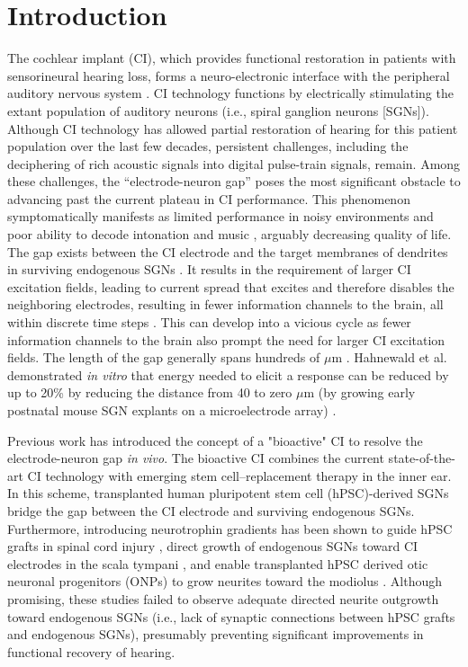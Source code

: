 \documentclass[review]{elsarticle}
\begin{document}
\section{Introduction}
\indent The cochlear implant (CI), which provides functional restoration in patients with sensorineural hearing loss, forms a neuro-electronic interface with the peripheral auditory nervous system \cite{Naples2020a}. CI technology functions by electrically stimulating the extant population of auditory neurons (i.e., spiral ganglion neurons [SGNs]). Although CI technology has allowed partial restoration of hearing for this patient population over the last few decades, persistent challenges, including the deciphering of rich acoustic signals into digital pulse-train signals, remain. Among these challenges, the “electrode-neuron gap” poses the most significant obstacle to advancing past the current plateau in CI performance. This phenomenon symptomatically manifests as limited performance in noisy environments and poor ability to decode intonation and music \cite{Wilson2008a}, arguably decreasing quality of life. The gap exists between the CI electrode and the target membranes of dendrites in surviving endogenous SGNs \cite{Frick2017}. It results in the requirement of larger CI excitation fields, leading to current spread that excites and therefore disables the neighboring electrodes, resulting in fewer information channels to the brain, all within discrete time steps \cite{Wilson2008a, Hahnewald2016}. This can develop into a vicious cycle as fewer information channels to the brain also prompt the need for larger CI excitation fields. The length of the gap generally spans hundreds of $\mu$m \cite{Shepherd1993, Tykocinski2000}. Hahnewald et al. demonstrated \textit{in vitro} that energy needed to elicit a response can be reduced by up to 20\% by reducing the distance from 40 to zero $\mu$m (by growing early postnatal mouse SGN explants on a microelectrode array) \cite{Hahnewald2016}.

\indent Previous work has introduced the concept of a "bioactive" CI to resolve the electrode-neuron gap \textit{in vivo}\cite{Roemer2016a, Heuer2021, Chang2020}. The bioactive CI combines the current state-of-the-art CI technology with emerging stem cell–replacement therapy in the inner ear. In this scheme, transplanted human pluripotent stem cell (hPSC)-derived SGNs bridge the gap between the CI electrode and surviving endogenous SGNs. Furthermore, introducing neurotrophin gradients has been shown to guide hPSC grafts in spinal cord injury \cite{Taylor2006}, direct growth of endogenous SGNs toward CI electrodes in the scala tympani \cite{Senn2017}, and enable transplanted hPSC derived otic neuronal progenitors (ONPs) to grow neurites toward the modiolus \cite{Chang2020}. Although promising, these studies failed to observe adequate directed neurite outgrowth toward endogenous SGNs (i.e., lack of synaptic connections between hPSC grafts and endogenous SGNs), presumably preventing significant improvements in functional recovery of hearing.
\end{document}
